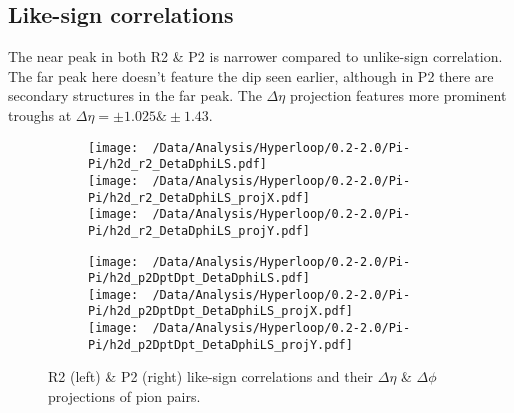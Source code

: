 \documentclass[12pt,a4paper,twoside]{report}
\begin{document}
\subsection{Like-sign correlations}
The near peak in both R2 \& P2 is narrower compared to unlike-sign correlation. The far peak here doesn't feature the dip seen earlier, although in P2 there are secondary structures in the far peak. The $\Delta\eta$ projection features more prominent troughs at $\Delta\eta=\pm1.025\&\pm1.43$.
\begin{figure}[H]
	\begin{subfigure}{0.49\linewidth}
		\texttt{[image: ~/Data/Analysis/Hyperloop/0.2-2.0/Pi-Pi/h2d\_r2\_DetaDphiLS.pdf]}\\
		\texttt{[image: ~/Data/Analysis/Hyperloop/0.2-2.0/Pi-Pi/h2d\_r2\_DetaDphiLS\_projX.pdf]}\\
		\texttt{[image: ~/Data/Analysis/Hyperloop/0.2-2.0/Pi-Pi/h2d\_r2\_DetaDphiLS\_projY.pdf]}\\
	\end{subfigure}
	\begin{subfigure}{0.49\linewidth}
		\texttt{[image: ~/Data/Analysis/Hyperloop/0.2-2.0/Pi-Pi/h2d\_p2DptDpt\_DetaDphiLS.pdf]}\\
		\texttt{[image: ~/Data/Analysis/Hyperloop/0.2-2.0/Pi-Pi/h2d\_p2DptDpt\_DetaDphiLS\_projX.pdf]}\\
		\texttt{[image: ~/Data/Analysis/Hyperloop/0.2-2.0/Pi-Pi/h2d\_p2DptDpt\_DetaDphiLS\_projY.pdf]}\\
	\end{subfigure}
	\caption{R2 (left) \& P2 (right) like-sign correlations and their $\Delta\eta$ \& $\Delta\phi$ projections of pion pairs.}
\end{figure}
\end{document}
